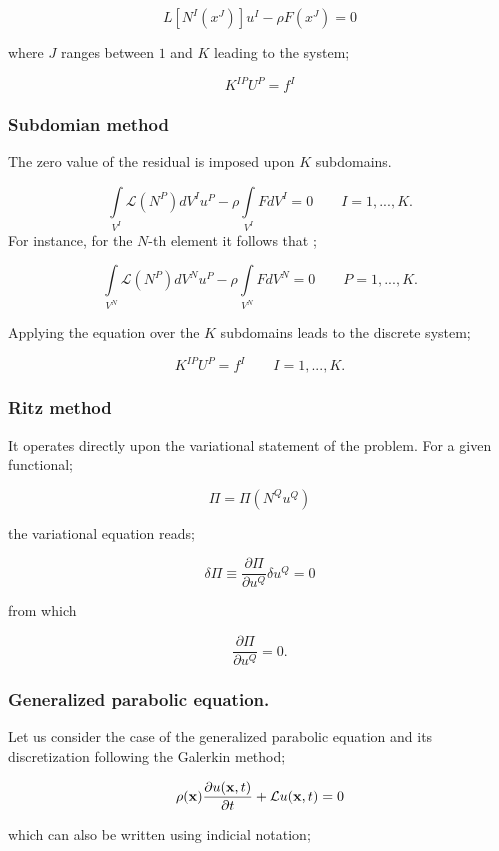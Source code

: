 \[L[{N^I}({x^J})]{u^I} - \rho F({x^J}) = 0\]

where $J$ ranges between $1$ and $K$ leading to the system;

\begin{equation}
{K^{IP}}{U^P} = {f^I}
\label{DColo}
\end{equation}

\subsubsection{Subdomian method}
The zero value of the residual is imposed upon $K$ subdomains.

\[\int\limits_{{V^I}} {\mathcal{L}({N^P})d{V^I}{u^P}}  - \rho \int\limits_{{V^I}} {Fd{V^I}}  = 0 \quad \quad I=1,...,K.\] For instance, for the $N$-th element it follows that ;

\[\int\limits_{{V^N}} {\mathcal{L}({N^P})d{V^N}{u^P}}  - \rho \int\limits_{{V^N}} {Fd{V^N}}  = 0 \quad \quad P=1,...,K.\]

Applying the equation over the $K$ subdomains leads to the discrete system;


\begin{equation}
{K^{IP}}{U^P} = {f^I} \quad \quad I=1,...,K.
\label{DColo}
\end{equation}

\subsubsection{Ritz method} It operates directly upon the variational statement of the problem. For a given functional;

\[\Pi  = \Pi ({N^Q}{u^Q})\]

the variational equation reads;

\[\delta \Pi  \equiv \frac{{\partial \Pi }}{{\partial {u^Q}}}\delta {u^Q} = 0\]

from which

\[\frac{{\partial \Pi }}{{\partial {u^Q}}} = 0.\]

\subsubsection*{Generalized parabolic equation.}
Let us consider the case of the generalized parabolic equation and its discretization following the Galerkin method;

\[\rho(\vb x) \pdv{u(\vb x,t)}{t} + \mathcal{L}u(\vb x, t) = 0\]

which can also be written using indicial notation;

